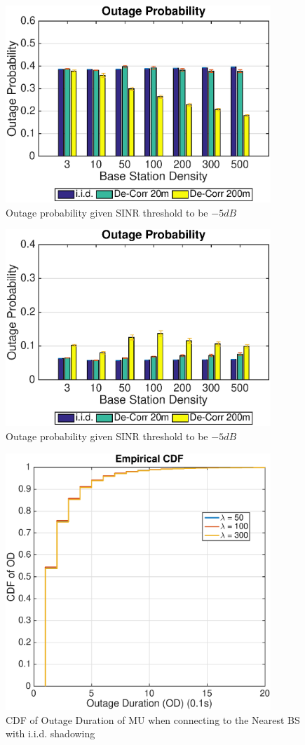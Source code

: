  \begin{figure}
 \centering
 \includegraphics[width=10cm]{NBMax1000OutageProbThresh-5iid.eps}
 \caption{Outage probability given SINR threshold to be $-5dB$}
 \label{fig: outprob1}
 \end{figure}
 \begin{figure}
 \centering
 \includegraphics[width=10cm]{MaxMax1000OutageProbThresh-5iid.eps}
 \caption{Outage probability given SINR threshold to be $-5dB$}
 \label{fig: outprobs2}
 \end{figure}
 \begin{figure}
 \centering
 \includegraphics[width=10cm]{ODthresh-5iidNB.eps}
 \caption{CDF of Outage Duration of MU when connecting to the Nearest BS with i.i.d. shadowing}
 \label{iid1}
 \end{figure}

